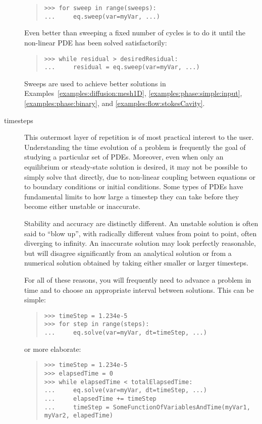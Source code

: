 \begin{description}
\begin{quote}
\begin{verbatim}
>>> for sweep in range(sweeps):
...     eq.sweep(var=myVar, ...)
\end{verbatim}
        \end{quote}
        Even better than sweeping a fixed number of cycles is to do it 
        until the non-linear PDE has been solved satisfactorily:
        \begin{quote}
\begin{verbatim}
>>> while residual > desiredResidual:
...     residual = eq.sweep(var=myVar, ...)
\end{verbatim}
        \end{quote}
        Sweeps are used to achieve better solutions in
        Examples~\ref{examples:diffusion:mesh1D}, 
        \ref{examples:phase:simple:input}, 
        \ref{examples:phase:binary}, and \ref{examples:flow:stokesCavity}.

        \item[timesteps] This outermost layer of repetition is of most
        practical interest to the user. Understanding the time
        evolution of a problem is frequently the goal of studying a
        particular set of PDEs. Moreover, even when only an
        equilibrium or steady-state solution is desired, it may not be
        possible to simply solve that directly, due to non-linear
        coupling between equations or to boundary conditions or
        initial conditions. Some types of PDEs have fundamental 
        limits to how large a timestep they can take before they 
        become either unstable or inaccurate.
        \begin{reSTadmonition}[Note]
        Stability and accuracy are distinctly different. An unstable 
        solution is often said to ``blow up'', with radically 
        different values from point to point, often diverging to 
        infinity. An inaccurate solution may look perfectly 
        reasonable, but will disagree significantly from an 
        analytical solution or from a numerical solution obtained by 
        taking either smaller or larger timesteps. 
        \end{reSTadmonition}
        For all of these reasons, you will frequently need to advance
        a problem in time and to choose an appropriate interval
        between solutions. This can be simple:
        \begin{quote}
\begin{verbatim}
>>> timeStep = 1.234e-5
>>> for step in range(steps):
...     eq.solve(var=myVar, dt=timeStep, ...)
\end{verbatim}
        \end{quote}
        or more elaborate:
        \begin{quote}
\begin{verbatim}
>>> timeStep = 1.234e-5
>>> elapsedTime = 0
>>> while elapsedTime < totalElapsedTime:
...     eq.solve(var=myVar, dt=timeStep, ...)
...     elapsedTime += timeStep
...     timeStep = SomeFunctionOfVariablesAndTime(myVar1, myVar2, elapedTime)
\end{verbatim}
        \end{quote}


\end{description}
